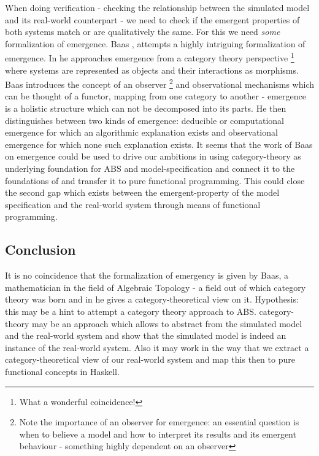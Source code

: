 When doing verification - checking the relationship between the simulated model and its real-world counterpart - we need to check if the emergent properties of both systems match or are qualitatively the same. For this we need \textit{some} formalization of emergence.
Baas \cite{baas_emergence_1994}, \cite{baas_emergence_1997} attempts a highly intriguing formalization of emergence. In \cite{baas_emergence_1997} he approaches emergence from a category theory perspective \footnote{What a wonderful coincidence!} where systems are represented as objects and their interactions as morphisms. Baas introduces the concept of an observer \footnote{Note the importance of an observer for emergence: an essential question is when to believe a model and how to interpret its results and its emergent behaviour - something highly dependent on an observer} and observational mechanisms which can be thought of a functor, mapping from one category to another - emergence is a holistic structure which can not be decomposed into its parts. He then distinguishes between two kinds of emergence: deducible or computational emergence for which an algorithmic explanation exists and observational emergence for which none such explanation exists. It seems that the work of Baas on emergence could be used to drive our ambitions in using category-theory as underlying foundation for ABS and model-specification and connect it to the foundations of and transfer it to pure functional programming. This could close the second gap which exists between the emergent-property of the model specification and the real-world system through means of functional programming.

\subsection{Conclusion}
It is no coincidence that the formalization of emergency is given by Baas, a mathematician in the field of Algebraic Topology - a field out of which category theory was born and in \cite{baas_emergence_1997} he gives a category-theoretical view on it.
Hypothesis: this may be a hint to attempt a category theory approach to ABS. category-theory may be an approach which allows to abstract from the simulated model and the real-world system and show that the simulated model is indeed an instance of the real-world system. Also it may work in the way that we extract a category-theoretical view of our real-world system and map this then to pure functional concepts in Haskell.


